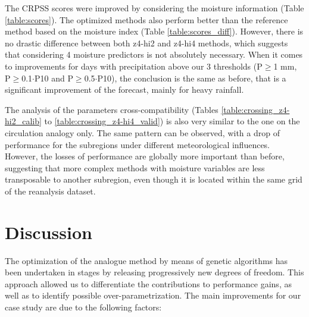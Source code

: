 \documentclass{ametsoc}
\begin{document}
The CRPSS scores were improved by considering the moisture information (Table \ref{table:scores}). The optimized methods also perform better than the reference method based on the moisture index (Table \ref{table:scores_diff}). However, there is no drastic difference between both z4-hi2 and z4-hi4 methods, which suggests that considering 4 moisture predictors is not absolutely necessary. When it comes to improvements for days with precipitation above our 3 thresholds (P\(\geq\)1 mm, P\(\geq\)0.1\(\cdot\)P10 and P\(\geq\)0.5\(\cdot\)P10), the conclusion is the same as before, that is a significant improvement of the forecast, mainly for heavy rainfall.

The analysis of the parameters cross-compatibility (Tables \ref{table:crossing_z4-hi2_calib} to \ref{table:crossing_z4-hi4_valid}) is also very similar to the one on the circulation analogy only. The same pattern can be observed, with a drop of performance for the subregions under different meteorological influences. However, the losses of performance are globally more important than before, suggesting that more complex methods with moisture variables are less transposable to another subregion, even though it is located within the same grid of the reanalysis dataset.


\section{Discussion}

The optimization of the analogue method by means of genetic algorithms has been undertaken in stages by releasing progressively new degrees of freedom. This approach allowed us to differentiate the contributions to performance gains, as well as to identify possible over-parametrization. The main improvements for our case study are due to the following factors:
\end{document}
